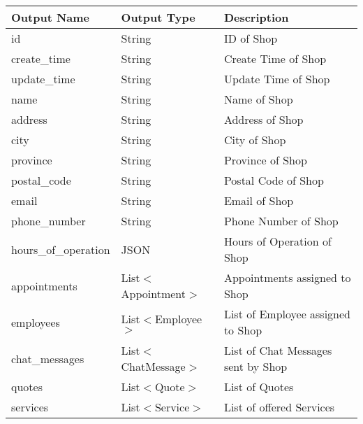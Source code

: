 \documentclass[12pt, titlepage]{article}
\begin{document}
\begin{table}[H]
	\begin{tabular}{|p{}|p{}|p{}|}
		\hline
		\textbf{Output Name} & \textbf{Output Type}  & \textbf{Description}               \\
		\hline
		id                   & String                & ID of Shop                         \\
		\hline
		create\_time         & String                & Create Time of Shop                \\
		\hline
		update\_time         & String                & Update Time of Shop                \\
		\hline
		name                 & String                & Name of Shop                       \\
		\hline
		address              & String                & Address of Shop                    \\
		\hline
		city                 & String                & City of Shop                       \\
		\hline
		province             & String                & Province of Shop                   \\
		\hline
		postal\_code         & String                & Postal Code of Shop                \\
		\hline
		email                & String                & Email of Shop                      \\
		\hline
		phone\_number        & String                & Phone Number of Shop               \\
		\hline
		hours\_of\_operation & JSON                  & Hours of Operation of Shop         \\
		\hline
		appointments         & List$<$Appointment$>$ & Appointments assigned to Shop      \\
		\hline
		employees            & List$<$Employee$>$    & List of Employee assigned to Shop  \\
		\hline
		chat\_messages       & List$<$ChatMessage$>$ & List of Chat Messages sent by Shop \\
		\hline
		quotes               & List$<$Quote$>$       & List of Quotes                     \\
		\hline
		services             & List$<$Service$>$     & List of offered Services           \\
		\hline
	\end{tabular}
\end{table}
\end{document}
